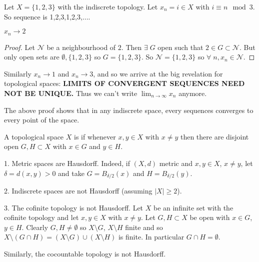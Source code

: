 \begin{example}
    Let $X = \{1,2,3\}$ with the indiscrete topology. Let $x_n =i\in X$ with $i\equiv n \mod 3$. So sequence is 1,2,3,1,2,3,$\dots$.

    \begin{claim}
        $x_n \to 2$
    \end{claim} 

    \begin{proof}
    Let $\mathcal{N}$ be a neighbourhood of $2$. Then $\exists \; G$ open such that $2 \in G \subset \mathcal{N}$.
    But only open sets are $\emptyset, \{1,2,3\}$ so $G = \{1,2,3\}$. So $\mathcal{N} = \{1,2,3\}$ so $\forall \; n, x_n \in \mathcal{N}$. 
    \end{proof}
    Similarly $x_n \to 1$ and $x_n \to 3$, and so we arrive at the big revelation for topological spaces: \textbf{\color{red} LIMITS OF CONVERGENT SEQUENCES NEED NOT BE UNIQUE.}
    Thus we can't write $\lim_{n \to \infty} x_n$ anymore.
\end{example} 

\begin{remark}
The above proof shows that in any indiscrete space, every sequences converges to every point of the space.
\end{remark}

\begin{definition}[Hausdorff]
A topological space $X$ is  if whenever $x,y \in X$ with $x \neq y$ then there are disjoint open $G,H \subset X$ with $x \in G$ and $y \in H$.
\end{definition}

\begin{example}
1. Metric spaces are Hausdorff. Indeed, if $(X,d)$ metric and $x,y \in X$, $x \neq y$, let $\delta = d(x,y) >0$ and take $G = B_{\delta/2}(x)$ and $H=B_{\delta/2}(y)$.

2. Indiscrete spaces are not Hausdorff (assuming $|X| \geq 2$).

3. The cofinite topology is not Hausdorff. Let $X$ be an infinite set with the cofinite topology and let $x,y\in X$ with $x\neq y$. Let $G,H\subset X$ be open with $x\in G$, $y\in H$. Clearly $G,H\neq \emptyset$ so $X \setminus G$, $X \setminus H$ finite and so $X \setminus (G\cap H) = (X \setminus G)\cup (X \setminus H)$ is finite. In particular $G\cap H = \emptyset$.

Similarly, the cocountable topology is not Hausdorff.
\end{example}

